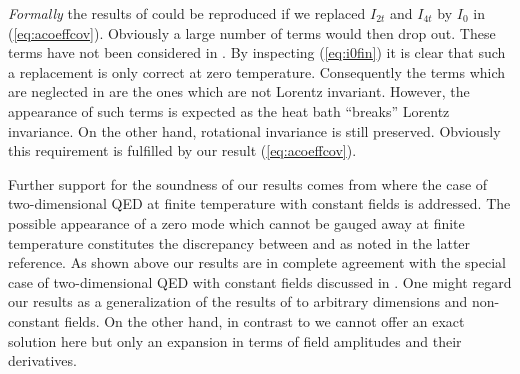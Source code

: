 \documentclass[a4paper,showpacs,showkeys,prd,nofootinbib]{revtex4}
\begin{document}
{\em Formally} the results of \cite{Boschi-Filho:1992ah} could be reproduced if we replaced 
$I_{2t}$ and $I_{4t}$ by $I_0$ in (\ref{eq:acoeffcov}). Obviously a large number of 
terms would then drop out. 
These terms have not been considered in \cite{Boschi-Filho:1992ah}. By inspecting 
(\ref{eq:i0fin}) it is clear that such a replacement is only correct at zero 
temperature. Consequently the terms which are neglected in \cite{Boschi-Filho:1992ah} are the
ones which are not Lorentz invariant. However, the appearance of such terms is
expected as the heat bath ``breaks'' Lorentz invariance. On the other hand, rotational
invariance is still preserved. Obviously this requirement is fulfilled by our result
(\ref{eq:acoeffcov}). 

Further support for the soundness of our results comes from \cite{Actor:1998cn} where
the case of two-dimensional QED at finite temperature with constant fields is 
addressed. The possible appearance of a zero mode which cannot be gauged away at finite
temperature constitutes the discrepancy between
\cite{Boschi-Filho:1992ah} and \cite{Actor:1998cn} as noted in the latter reference.
As shown above our results are
in complete agreement with the special case of two-dimensional QED with constant fields
discussed in \cite{Actor:1998cn}. One might regard
our results as a generalization of the results of \cite{Actor:1998cn} to arbitrary 
dimensions and non-constant fields. On the other hand, in
contrast to \cite{Actor:1998cn} we cannot offer an exact solution here but only an expansion
in terms of field amplitudes and their derivatives. 
\end{document}
